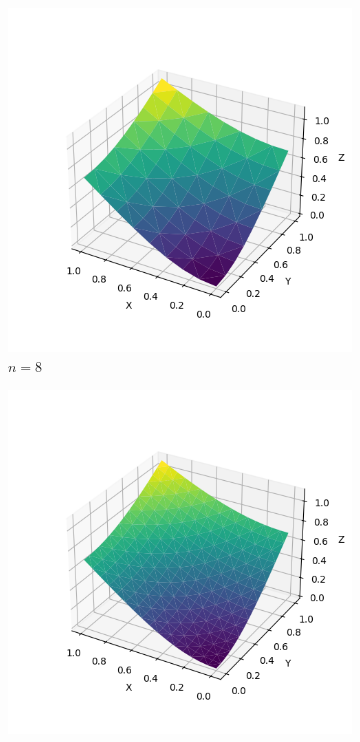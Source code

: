 \documentclass[lang=cn,a4paper,newtx,bibend=bibtex]{elegantpaper}
\begin{document}
\begin{figure}[H]
  \centering
  \begin{subfigure}[b]{0.18\textwidth}
      \includegraphics[width=\textwidth]{../../res_bac/res-[data|3-Neumann-regular-a8].png}
      \caption{$n =  8$}
  \end{subfigure}
  \hfill
  \begin{subfigure}[b]{0.18\textwidth}
      \includegraphics[width=\textwidth]{../../res_bac/res-[data|3-Neumann-regular-b16].png}

\end{subfigure}
\end{figure}
\end{document}

